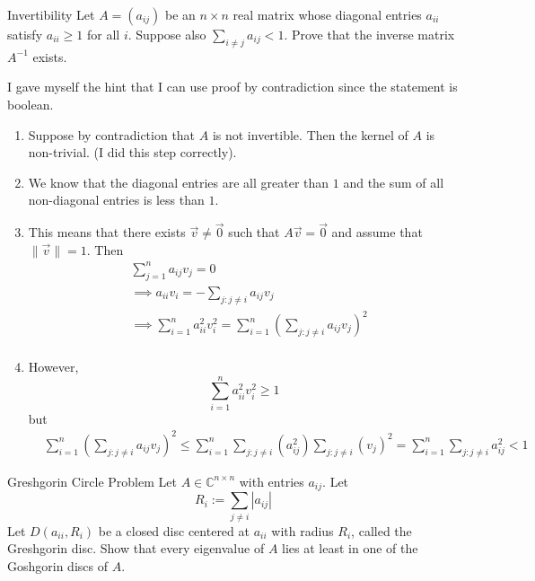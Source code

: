 \documentclass[../main]{subfiles}
\begin{document}
\begin{bbox}{Invertibility }
    Let $A=(a_{ij})$ be an $n\times n$ real matrix whose diagonal entries $a_{ii}$ satisfy $a_{ii}\ge 1$ for all $i$. Suppose also $\sum_{i\ne j} a_{ij} < 1$. Prove that the inverse matrix $A^{-1}$ exists.
\end{bbox}
\begin{solution}
    I gave myself the hint that I can use proof by contradiction since the statement is boolean.
    \begin{enumerate}
        \item Suppose by contradiction that $A$ is not invertible. Then the kernel of $A$ is non-trivial. (I did this step correctly). 
        \item We know that the diagonal entries are all greater than $1$ and the sum of all non-diagonal entries is less than $1$.
        \item This means that there exists $\vec v \ne \vec 0$ such that $A\vec v = \vec 0$ and assume that $\|\vec v\| = 1$. Then
        \begin{align*}
            &\sum_{j=1}^n a_{ij} v_j  =0\\
            &\implies a_{ii}v_{i} = -\sum_{j:j\ne i}a_{ij} v_j\\
            &\implies \sum_{i=1}^n a_{ii}^2 v_i^2 = \sum_{i=1}^n (\sum_{j:j\neq i}a_{ij}v_j)^2\\
        \end{align*}
        \item However, \[
        \sum_{i=1}^n a_{ii}^2 v_i^2\ge 1
        \]
        but 
        \begin{align*}
        &\sum_{i=1}^n(\sum_{j:j\ne i}a_{ij}v_j)^2 \le \sum_{i=1}^n \sum_{j:j\ne i}(a_{ij}^2) \sum_{j:j\ne i}(v_j)^2 = \sum_{i=1}^n \sum_{j: j\ne i} a_{ij}^2 < 1
        \end{align*}
    \end{enumerate}
\end{solution}
\begin{bbox}{Greshgorin Circle Problem}
    Let $A\in \mathbb C^{n\times n}$ with entries $a_{ij}$. Let \[
    R_i := \sum_{j\neq i} |a_{ij}|
    \]
    Let $D(a_{ii}, R_i)$ be a closed disc centered at $a_{ii}$ with radius $R_{i}$, called the Greshgorin disc. Show that every eigenvalue of $A$ lies at least in one of the Goshgorin discs of $A$.
    \end{bbox}
\end{document}
